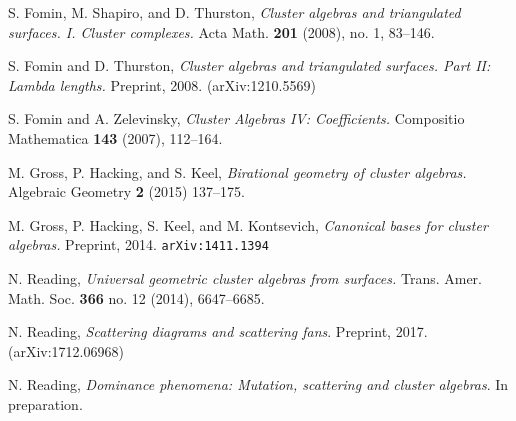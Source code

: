 \documentclass{amsart}
\theoremstyle{definition}
\theoremstyle{remark}
\numberwithin{equation}{section}
\newcommand{\0}{{\mathbf{0}}}
\begin{document}
\begin{thebibliography}{27}

S. Fomin, M. Shapiro, and D. Thurston,
\textit{Cluster algebras and triangulated surfaces. I. Cluster complexes.}
Acta Math. \textbf{201} (2008), no. 1, 83--146. 

S. Fomin and D. Thurston,
\textit{Cluster algebras and triangulated surfaces. Part II: Lambda lengths.}
Preprint, 2008.
(arXiv:1210.5569)

S. Fomin and A. Zelevinsky,
\textit{Cluster Algebras IV: Coefficients.}
Compositio Mathematica \textbf{143} (2007), 112--164.

M. Gross, P. Hacking, and S. Keel,
\textit{Birational geometry of cluster algebras.}
Algebraic Geometry \textbf{2} (2015) 137--175.

M. Gross, P. Hacking, S. Keel, and M. Kontsevich,
\textit{Canonical bases for cluster algebras.}
Preprint, 2014. \texttt{arXiv:1411.1394}

N. Reading,
\textit{Universal geometric cluster algebras from surfaces. }
Trans. Amer. Math. Soc. \textbf{366} no. 12 (2014), 6647--6685.

N. Reading, 
\textit{Scattering diagrams and scattering fans}. 
Preprint, 2017.  (arXiv:1712.06968)

N. Reading, 
\textit{Dominance phenomena: Mutation, scattering and cluster algebras}. 
In preparation.

\end{thebibliography}
\end{document}
